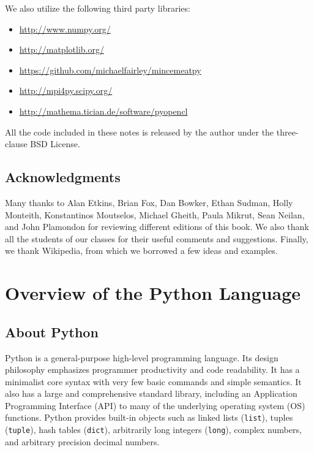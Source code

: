 \documentclass[justified,sixbynine]{tufte-book}
\def\ft{\small\tt}
\theoremstyle{plain}%
\theoremstyle{definition}
\theoremstyle{remark}
\begin{document}
\begin{fullwidth}
We also utilize the following third party libraries:

\begin{itemize}
\item \url{http://www.numpy.org/}
\item \url{http://matplotlib.org/}
\item \url{https://github.com/michaelfairley/mincemeatpy}
\item \url{http://mpi4py.scipy.org/}
\item \url{http://mathema.tician.de/software/pyopencl}
\end{itemize}

All the code included in these notes is released by the author under the three-clause BSD License.

\section*{Acknowledgments}

Many thanks to Alan Etkins, Brian Fox, Dan Bowker, Ethan Sudman, Holly Monteith, Konstantinos Moutselos, Michael Gheith, Paula Mikrut, Sean Neilan, and John Plamondon for reviewing different editions of this book. We also thank all the students of our classes for their useful comments and suggestions. Finally, we thank Wikipedia, from which we borrowed a few ideas and examples.

\goodbreak\chapter{Overview of the Python Language}


\goodbreak\section{About Python}

Python is a general-purpose high-level programming language.
Its design philosophy emphasizes programmer productivity and code readability. It has a minimalist core syntax with very few basic commands and simple semantics. It also has a large and comprehensive standard library, including an Application Programming Interface (API)  to many of the underlying operating system (OS) functions. Python provides built-in objects such as linked lists ({\ft list}), tuples ({\ft tuple}), hash tables ({\ft dict}), arbitrarily long integers ({\ft long}), complex numbers, and arbitrary precision decimal numbers.


\end{fullwidth}
\end{document}
